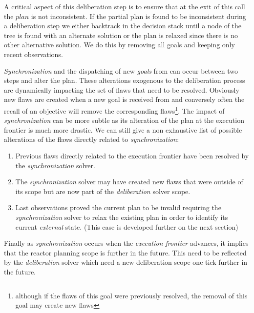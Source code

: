 A critical aspect of this deliberation step is to ensure that at the
exit of this call the $plan$ is not inconsistent. %
If the partial plan is found to be inconsistent during a deliberation
step we either backtrack in the decision stack until a node of the
tree is found with an alternate solution or the plan is relaxed since
there is no other alternative solution. We do this by removing all
goals and keeping only recent observations. %


{\em Synchronization} and the dispatching of new {\em goals} from
\rx can occur between two steps and alter the plan. These alterations
exogenous to the deliberation process are dynamically impacting the set
of flaws that need to be resolved. Obviously new flaws are created
when a new goal is received from \rx and conversely often the recall
of an objective will remove the corresponding flaws\footnote{although
  if the flaws of this goal were previously resolved, the removal of
  this goal may create new flaws}. The impact of {\em synchronization}
can be more subtle as its alteration of the plan at the execution
frontier is much more drastic. We can still give a non exhaustive list
of possible alterations of the flaws directly related to {\em
  synchronization}:
\begin{enumerate}
\item Previous flaws directly related to the execution frontier have
  been resolved by the {\em synchronization} solver.
\item The {\em synchronization} solver may have created new flaws that
  were outside of its scope but are now part of the {\em deliberation}
  solver scope.
\item Last observations proved the current plan to be invalid
  requiring the {\em synchronization} solver to relax the existing
  plan in order to identify its current {\em external} state. (This
  case is developed further on the next section)
\end{enumerate}
Finally as {\em synchronization} occurs when the {\em
  execution frontier} advances, it implies that the reactor planning
scope is further in the future. This need to be reflected by the {\em
  deliberation} solver which need a new deliberation scope one tick
further in the future.

